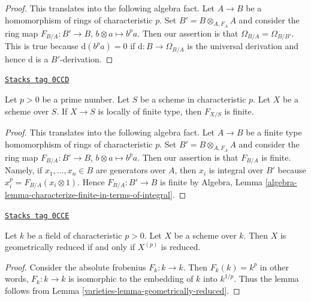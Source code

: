 \begin{proof}
This translates into the following algebra fact.
Let $A \to B$ be a homomorphism of rings of characteristic $p$.
Set $B' = B \otimes_{A, F_A} A$ and consider the ring map
$F_{B/A} : B' \to B$, $b \otimes a \mapsto b^pa$.
Then our assertion is that $\Omega_{B/A} = \Omega_{B/B'}$.
This is true because $\text{d}(b^pa) = 0$ if
$\text{d} : B \to \Omega_{B/A}$ is the universal derivation
and hence $\text{d}$ is a $B'$-derivation.
\end{proof}

\begin{lemma}
\label{varieties-lemma-relative-frobenius-finite}
\href{https://stacks.math.columbia.edu/tag/0CCD}{\texttt{Stacks tag 0CCD}}

Let $p > 0$ be a prime number. Let $S$ be a scheme in characteristic $p$.
Let $X$ be a scheme over $S$. If $X \to S$ is locally of finite type,
then $F_{X/S}$ is finite.
\end{lemma}

\begin{proof}
This translates into the following algebra fact.
Let $A \to B$ be a finite type homomorphism of rings of characteristic $p$.
Set $B' = B \otimes_{A, F_A} A$ and consider the ring map
$F_{B/A} : B' \to B$, $b \otimes a \mapsto b^pa$.
Then our assertion is that $F_{B/A}$ is finite.
Namely, if $x_1, \ldots, x_n \in B$ are generators over $A$,
then $x_i$ is integral over $B'$ because $x_i^p = F_{B/A}(x_i \otimes 1)$.
Hence $F_{B/A} : B' \to B$ is finite by
Algebra, Lemma \ref{algebra-lemma-characterize-finite-in-terms-of-integral}.
\end{proof}

\begin{lemma}
\label{varieties-lemma-geometrically-reduced-p}
\href{https://stacks.math.columbia.edu/tag/0CCE}{\texttt{Stacks tag 0CCE}}

Let $k$ be a field of characteristic $p > 0$. Let $X$ be a scheme over $k$.
Then $X$ is geometrically reduced if and only if $X^{(p)}$ is reduced.
\end{lemma}

\begin{proof}

Consider the absolute frobenius $F_k : k \to k$. Then $F_k(k) = k^p$
in other words, $F_k : k \to k$ is isomorphic to the embedding of
$k$ into $k^{1/p}$. Thus the lemma follows from
Lemma \ref{varieties-lemma-geometrically-reduced}.
\end{proof}

